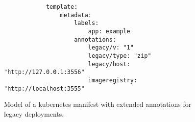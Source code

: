 \documentclass[../main.tex]{subfiles}
\begin{document}
    \begin{figure}[h]
        \begin{verbatim}
            template:
                metadata:
                    labels:
                        app: example
                    annotations:
                        legacy/v: "1"
                        legacy/type: "zip"
                        legacy/host: "http://127.0.0.1:3556"
                        imageregistry: "http://localhost:3555"
        \end{verbatim}
        \captionsetup{justification=centering}
        \caption{
            Model of a \gls{kubernetes} manifest with extended annotations for legacy deployments.
        }
        \label{lst:template_meta}
    \end{figure}
\end{document}

